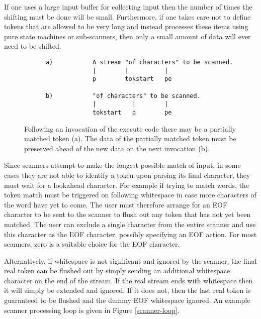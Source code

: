 \documentclass[letterpaper,11pt,oneside]{book}
\begin{document}
If one uses a large input buffer for collecting input then the number of times
the shifting must be done will be small. Furthermore, if one takes care not to
define tokens that are allowed to be very long and instead processes these
items using pure state machines or sub-scanners, then only a small amount of
data will ever need to be shifted.

\begin{figure}
\begin{verbatim}
      a)           A stream "of characters" to be scanned.
                   |        |          |
                   p        tokstart   pe

      b)           "of characters" to be scanned.
                   |          |        |
                   tokstart   p        pe
\end{verbatim}
\caption{Following an invocation of the execute code there may be a partially
matched token (a). The data of the partially matched token 
must be preserved ahead of the new data on the next invocation (b).}
\label{preserve_example}
\end{figure}

Since scanners attempt to make the longest possible match of input, in some
cases they are not able to identify a token upon parsing its final character,
they must wait for a lookahead character. For example if trying to match words,
the token match must be triggered on following whitespace in case more
characters of the word have yet to come. The user must therefore arrange for an
EOF character to be sent to the scanner to flush out any token that has not yet
been matched.  The user can exclude a single character from the entire scanner
and use this character as the EOF character, possibly specifying an EOF action.
For most scanners, zero is a suitable choice for the EOF character. 

Alternatively, if whitespace is not significant and ignored by the scanner, the
final real token can be flushed out by simply sending an additional whitespace
character on the end of the stream. If the real stream ends with whitespace
then it will simply be extended and ignored. If it does not, then the last real token is
guaranteed to be flushed and the dummy EOF whitespace ignored.
An example scanner processing loop is given in Figure \ref{scanner-loop}.
\end{document}
